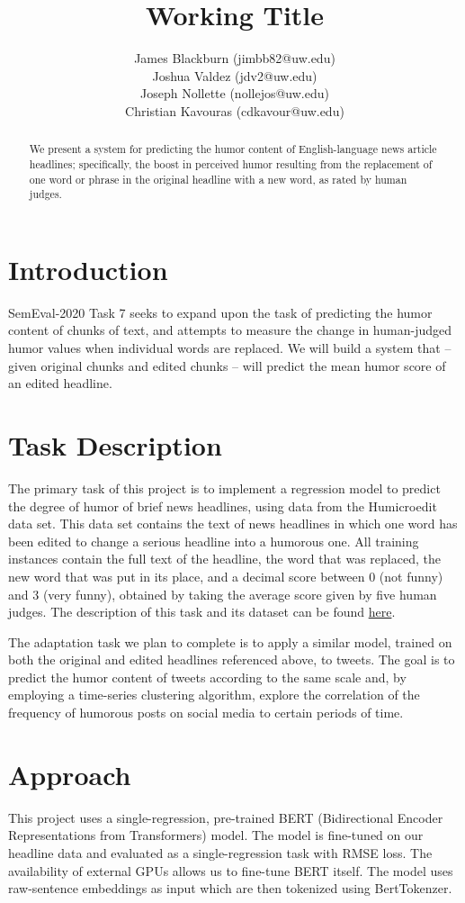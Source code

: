 \documentclass{article}
\title{Working Title}
\author{
James Blackburn (jimbb82@uw.edu)\\
Joshua Valdez (jdv2@uw.edu)\\
Joseph Nollette (nollejos@uw.edu)\\
Christian Kavouras (cdkavour@uw.edu)
}
\date{\vspace{-5ex}}
\begin{document}
\maketitle

\begin{abstract}
We present a system for predicting the humor content of English-language news article headlines; specifically, the boost in perceived humor resulting from the replacement of one word or phrase in the original headline with a new word, as rated by human judges.
\end{abstract}

\section{Introduction}
SemEval-2020 Task 7 seeks to expand upon the task of predicting the humor content of chunks of text, and attempts to measure the change in human-judged humor values when individual words are replaced. We will build a system that -- given original chunks and edited chunks -- will predict the mean humor score of an edited headline.

\section{Task Description}
The primary task of this project is to implement a regression model to predict the degree of humor of brief news headlines, using data from the Humicroedit data set. This data set contains the text of news headlines in which one word has been edited to change a serious headline into a humorous one. All training instances contain the full text of the headline, the word that was replaced, the new word that was put in its place, and a decimal score between 0 (not funny) and 3 (very funny), obtained by taking the average score given by five human judges. The description of this task and its dataset can be found \href{https://competitions.codalab.org/competitions/20970}{here}.\cite{hossain-etal-2019-president}

The adaptation task we plan to complete is to apply a similar model, trained on both the original and edited headlines referenced above, to tweets. The goal is to predict the humor content of tweets according to the same scale and, by employing a time-series clustering algorithm, explore the correlation of the frequency of humorous posts on social media to certain periods of time.

\section{Approach}
This project uses a single-regression, pre-trained BERT (Bidirectional Encoder Representations from Transformers) model. The model is fine-tuned on our headline data and evaluated as a single-regression task with RMSE loss. The availability of external GPUs allows us to fine-tune BERT itself. The model uses raw-sentence embeddings as input which are then tokenized using BertTokenzer.
\end{document}
